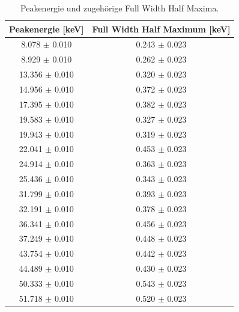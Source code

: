 \documentclass[12pt,a4paper]{article}
\begin{document}
\begin{table}
\centering
\begin{tabular}{|c|c|}
\hline 
Peakenergie [\si{keV}] & Full Width Half Maximum [\si{keV}] \\ 
\hline
8.078 $\pm$ 0.010 & 0.243 $\pm$ 0.023 \\ 
\hline
8.929 $\pm$ 0.010 & 0.262 $\pm$ 0.023 \\ 
\hline
13.356 $\pm$ 0.010 & 0.320 $\pm$ 0.023 \\ 
\hline
14.956 $\pm$ 0.010 & 0.372 $\pm$ 0.023 \\
\hline
17.395 $\pm$ 0.010 & 0.382 $\pm$ 0.023 \\ 
\hline
19.583 $\pm$ 0.010 & 0.327 $\pm$ 0.023 \\ 
\hline
19.943 $\pm$ 0.010 & 0.319 $\pm$ 0.023 \\ 
\hline
22.041 $\pm$ 0.010 & 0.453 $\pm$ 0.023 \\ 
\hline
24.914 $\pm$ 0.010 & 0.363 $\pm$ 0.023 \\
\hline
25.436 $\pm$ 0.010 & 0.343 $\pm$ 0.023 \\
\hline
31.799 $\pm$ 0.010 & 0.393 $\pm$ 0.023 \\ 
\hline 
32.191 $\pm$ 0.010 & 0.378 $\pm$ 0.023 \\ 
\hline
36.341 $\pm$ 0.010 & 0.456 $\pm$ 0.023 \\ 
\hline
37.249 $\pm$ 0.010 & 0.448 $\pm$ 0.023 \\  
\hline
43.754 $\pm$ 0.010 & 0.442 $\pm$ 0.023 \\ 
\hline
44.489 $\pm$ 0.010 & 0.430 $\pm$ 0.023 \\ 
\hline
50.333 $\pm$ 0.010 & 0.543 $\pm$ 0.023 \\ 
\hline
51.718 $\pm$ 0.010 & 0.520 $\pm$ 0.023 \\ 
\hline
\end{tabular} 
\caption{Peakenergie und zugehörige Full Width Half Maxima.}
\label{tab:alpha_energieaufloesung}
\end{table}
\end{document}
